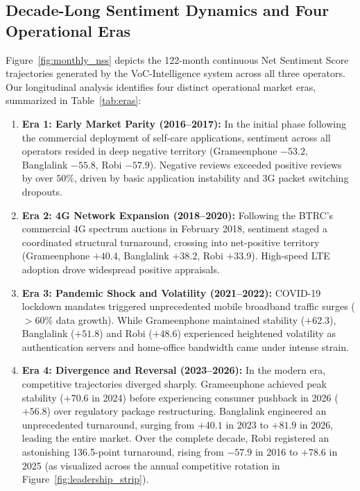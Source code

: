 \documentclass[review,12pt,authoryear]{elsarticle}
\begin{document}
\subsection{Decade-Long Sentiment Dynamics and Four Operational Eras}
Figure~\ref{fig:monthly_nss} depicts the 122-month continuous Net Sentiment Score trajectories generated by the VoC-Intelligence system across all three operators. Our longitudinal analysis identifies four distinct operational market eras, summarized in Table~\ref{tab:eras}:
\begin{enumerate}
    \item \textbf{Era 1: Early Market Parity (2016--2017):} In the initial phase following the commercial deployment of self-care applications, sentiment across all operators resided in deep negative territory (Grameenphone $-53.2$, Banglalink $-55.8$, Robi $-57.9$). Negative reviews exceeded positive reviews by over $50\%$, driven by basic application instability and 3G packet switching dropouts.
    \item \textbf{Era 2: 4G Network Expansion (2018--2020):} Following the BTRC's commercial 4G spectrum auctions in February 2018, sentiment staged a coordinated structural turnaround, crossing into net-positive territory (Grameenphone $+40.4$, Banglalink $+38.2$, Robi $+33.9$). High-speed LTE adoption drove widespread positive appraisals.
    \item \textbf{Era 3: Pandemic Shock and Volatility (2021--2022):} COVID-19 lockdown mandates triggered unprecedented mobile broadband traffic surges ($>60\%$ data growth). While Grameenphone maintained stability ($+62.3$), Banglalink ($+51.8$) and Robi ($+48.6$) experienced heightened volatility as authentication servers and home-office bandwidth came under intense strain.
    \item \textbf{Era 4: Divergence and Reversal (2023--2026):} In the modern era, competitive trajectories diverged sharply. Grameenphone achieved peak stability ($+70.6$ in 2024) before experiencing consumer pushback in 2026 ($+56.8$) over regulatory package restructuring. Banglalink engineered an unprecedented turnaround, surging from $+40.1$ in 2023 to $+81.9$ in 2026, leading the entire market. Over the complete decade, Robi registered an astonishing 136.5-point turnaround, rising from $-57.9$ in 2016 to $+78.6$ in 2025 (as visualized across the annual competitive rotation in Figure~\ref{fig:leadership_strip}).
\end{enumerate}
\end{document}

